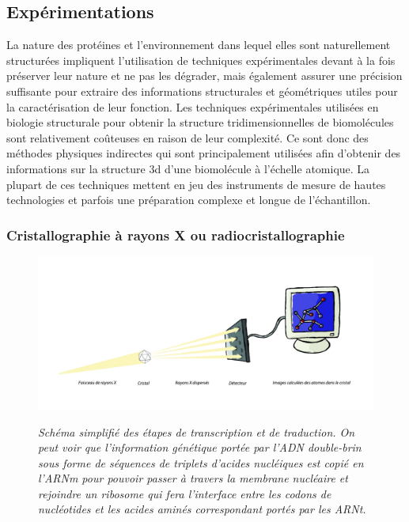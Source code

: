 \subsection{Expérimentations}

La nature des protéines et l'environnement dans lequel elles sont naturellement structurées impliquent l'utilisation de techniques expérimentales devant à la fois préserver leur nature et ne pas les dégrader, mais également assurer une précision suffisante pour extraire des informations structurales et géométriques utiles pour la caractérisation de leur fonction.
Les techniques expérimentales utilisées en biologie structurale pour obtenir la structure tridimensionnelles de biomolécules sont relativement coûteuses en raison de leur complexité. Ce sont donc des méthodes physiques indirectes qui sont principalement utilisées afin d'obtenir des informations sur la structure 3d d'une biomolécule à l'échelle atomique. La plupart de ces techniques mettent en jeu des instruments de mesure de hautes technologies et parfois une préparation complexe et longue de l'échantillon.

\subsubsection{Cristallographie à rayons X ou radiocristallographie}

\begin{figure}
  \centering
  {\includegraphics[width=0.85\linewidth]{./figures/ch1/cristallographie_x_ray.pdf}}
    \caption{\it Schéma simplifié des étapes de transcription et de traduction. On peut voir que l'information génétique portée par l'ADN double-brin sous forme de séquences de triplets d'acides nucléiques est copié en l'ARNm pour pouvoir passer à travers la membrane nucléaire et rejoindre un ribosome qui fera l'interface entre les codons de nucléotides et les acides aminés correspondant portés par les ARNt.}
    \label{Fig:cristallographie_x_ray}
  \hspace{0.3cm}
\end{figure}

